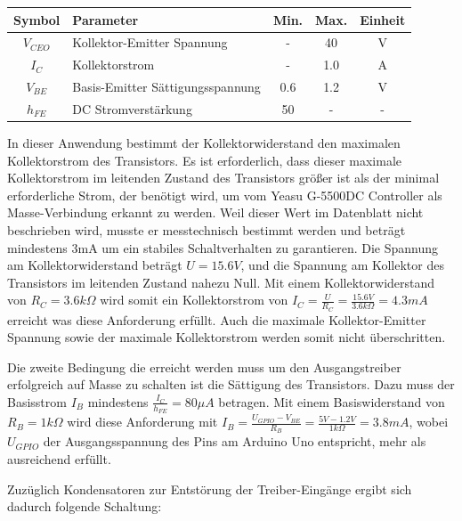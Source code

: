 \begin{tabular}{| c | l | c | c | c |}
	\hline
	\textbf{Symbol} & \textbf{Parameter} & \textbf{Min.} & \textbf{Max.} & \textbf{Einheit} \\
	\hline
	${V}_{CEO}$ & Kollektor-Emitter Spannung & - & 40 & V \\
	\hline
	${I}_{C}$ & Kollektorstrom & - & 1.0 & A \\
	\hline
	${V}_{BE}$ & Basis-Emitter Sättigungsspannung & 0.6 & 1.2 & V \\
	\hline
	${h}_{FE}$ & DC Stromverstärkung & 50 & - & - \\
	\hline
\end{tabular}

In dieser Anwendung bestimmt der Kollektorwiderstand den maximalen Kollektorstrom des Transistors. Es ist erforderlich, dass dieser maximale Kollektorstrom im leitenden Zustand des Transistors größer ist als der minimal erforderliche Strom, der benötigt wird, um vom Yeasu G-5500DC Controller als Masse-Verbindung erkannt zu werden. Weil dieser Wert im Datenblatt nicht beschrieben wird, musste er messtechnisch bestimmt werden und beträgt mindestens 3mA um ein stabiles Schaltverhalten zu garantieren. Die Spannung am Kollektorwiderstand beträgt $U=15.6V$, und die Spannung am Kollektor des Transistors im leitenden Zustand nahezu Null. Mit einem Kollektorwiderstand von $R_C=3.6k\Omega$ wird somit ein Kollektorstrom von $I_C=\frac{U}{R_C}=\frac{15.6V}{3.6k\Omega}=4.3mA$ erreicht was diese Anforderung erfüllt. Auch die maximale Kollektor-Emitter Spannung sowie der maximale Kollektorstrom werden somit nicht überschritten. 

Die zweite Bedingung die erreicht werden muss um den Ausgangstreiber erfolgreich auf Masse zu schalten ist die Sättigung des Transistors. Dazu muss der Basisstrom $I_B$ mindestens $\frac{I_C}{h_{FE}}=80\mu A$ betragen. Mit einem Basiswiderstand von $R_B=1k\Omega$ wird diese Anforderung mit $I_B=\frac{U_{GPIO}-V_{BE}}{R_B}=\frac{5V-1.2V}{1k\Omega}=3.8mA$, wobei $U_{GPIO}$ der Ausgangsspannung des Pins am Arduino Uno entspricht, mehr als ausreichend erfüllt. 

Zuzüglich Kondensatoren zur Entstörung der Treiber-Eingänge ergibt sich dadurch folgende Schaltung:

